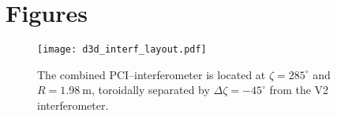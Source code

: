 \chapter{Figures}

\begin{figure}[ht]
\centering
\texttt{[image: d3d\_interf\_layout.pdf]}
\caption{%
  The combined PCI--interferometer is located at
  $\zeta = 285^{\circ}$ and $R = \SI{1.98}{\meter}$,
  toroidally separated by $\Delta \zeta = -45^{\circ}$
  from the V2 interferometer.}
\label{fig:d3d_interf_layout}
\end{figure}

\clearpage
\newpage
